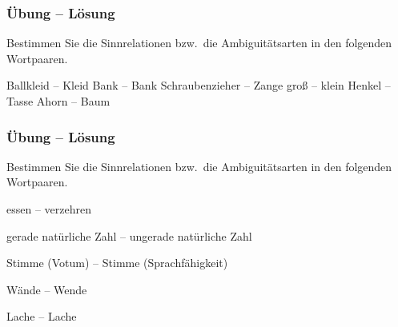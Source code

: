 
	
	\begin{frame}
		\frametitle{Übung -- Lösung}

Bestimmen Sie die Sinnrelationen bzw.\ die Ambiguitätsarten in den folgenden Wortpaaren.

\settowidth{}
\begin{exe}	
	 Ballkleid -- Kleid \pause {}
	 Bank -- Bank \pause {}
	 Schraubenzieher -- Zange \pause {}
	 gro\ss{} -- klein \pause {}
	 Henkel -- Tasse \pause {}
	 Ahorn -- Baum \pause {}
\end{exe}

\end{frame}


\begin{frame}
	\frametitle{Übung -- Lösung}
	
Bestimmen Sie die Sinnrelationen bzw.\ die Ambiguitätsarten in den folgenden Wortpaaren.
	
\settowidth{}
\begin{exe}
	 essen -- verzehren \pause {}

	 gerade natürliche Zahl -- ungerade  natürliche Zahl 
	
	\pause {}

	 Stimme (Votum) -- Stimme (Sprachfähigkeit) \pause {}

	 Wände -- Wende \pause {}

	 Lache -- Lache \pause {}
\end{exe}

\end{frame}